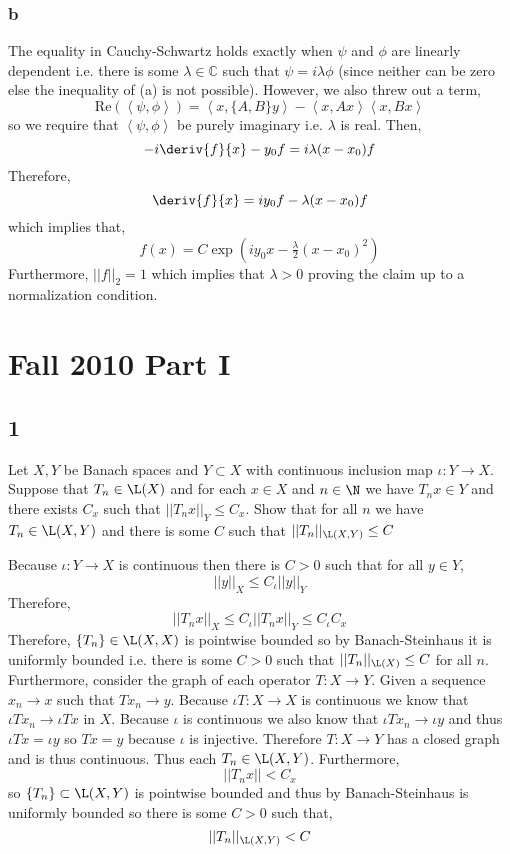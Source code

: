 \documentclass[12pt]{article}
\newcommand{\inner}[2]{\left< #1, #2 \right>}
\renewcommand{\C}{\mathbb{C}}
\begin{document}
\subsubsection{b}

The equality in Cauchy-Schwartz holds exactly when $\psi$ and $\phi$ are linearly dependent i.e. there is some $\lambda \in \C$ such that $\psi = i \lambda \phi$ (since neither can be zero else the inequality of (a) is not possible). However, we also threw out a term,
\[ \mathrm{Re}(\inner{\psi}{\phi}) = \inner{x}{\{ A, B \} y} - \inner{x}{A x} \inner{x}{B x}  \]
so we require that $\inner{\psi}{\phi}$ be purely imaginary i.e. $\lambda$ is real. Then,
\[ - i \deriv{f}{x} - y_0 f = i \lambda (x - x_0) f \]
Therefore,
\[ \deriv{f}{x} = i y_0 f - \lambda (x - x_0) f \]
which implies that,
\[ f(x) = C \exp{\left( i y_0 x - \tfrac{\lambda}{2}(x - x_0)^2 \right)} \]
Furthermore, $|| f ||_2 = 1$ which implies that $\lambda > 0$ proving the claim up to a normalization condition. 

\section{Fall 2010 Part I}

\subsection{1}

\begin{exercise}
Let $X, Y$ be Banach spaces and $Y \subset X$ with continuous inclusion map $\iota : Y \to X$. Suppose that $T_n \in \L(X)$ and for each $x \in X$ and $n \in \N$ we have $T_n x \in Y$ and there exists $C_x$ such that $|| T_n x ||_Y \le C_x$. Show that for all $n$ we have $T_n \in \L(X, Y)$ and there is some $C$ such that $|| T_n ||_{\L(X, Y)} \le C$
\end{exercise}

Because $\iota : Y \to X$ is continuous then there is $C > 0$ such that for all $y \in Y$,
\[ || y ||_X \le C_\iota || y ||_Y \]
Therefore,
\[ || T_n x ||_X \le C_\iota || T_n x ||_Y \le C_\iota C_x \]
Therefore, $\{ T_n \} \in \L(X, X)$ is pointwise bounded so by Banach-Steinhaus it is uniformly bounded i.e. there is some $C > 0$ such that $|| T_n ||_{\L(X)} \le C$ for all $n$. Furthermore, consider the graph of each operator $T : X \to Y$. Given a sequence $x_n \to x$ such that $T x_n \to y$. Because $\iota T : X \to X$ is continuous we know that $\iota T x_n \to \iota T x$ in $X$. Because $\iota$ is continuous we also know that $\iota T x_n \to \iota y$ and thus $\iota T x = \iota y$ so $T x = y$ because $\iota$ is injective. Therefore $T : X \to Y$ has a closed graph and is thus continuous. Thus each $T_n \in \L(X, Y)$. Furthermore, 
\[ || T_n x || < C_x \]
so $\{ T_n \} \subset \L(X, Y)$ is pointwise bounded and thus by Banach-Steinhaus is uniformly bounded so there is some $C > 0$ such that,
\[ || T_n ||_{\L(X, Y)} < C \]
\end{document}
